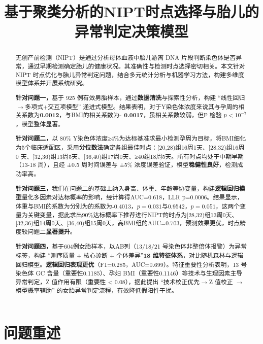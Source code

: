 \documentclass[withoutpreface,bwprint]{cumcmthesis} %
\title{基于聚类分析的NIPT时点选择与胎儿的异常判定决策模型}
\begin{document}
\maketitle
\nocite{*}


\begin{abstract}
无创产前检测（NIPT）是通过分析母体血液中胎儿游离 DNA 片段判断染色体是否异常，通过早期检测确定胎儿的健康状况。其准确性与检测时点选择密切相关。本文针对 NIPT 时点优化与胎儿异常判定问题，结合多元统计分析与机器学习方法，构建多维度模型体系并开展系统研究。

    \textbf{针对问题一，}基于 925 例有效男胎样本，通过\textbf{数据清洗}与探索性分析，构建 “线性回归$\to$多项式+交互项模型” 递进式模型。结果表明，对于Y染色体浓度来说其与孕周的相关系数为\textbf{0.0012}，与BMI的相关系数为\textbf{- 0.0017}，虽相关系数较弱，但F 检验 $p<10^{-7}$，模型整体显著。

    \textbf{针对问题二，}以 80\% Y染色体浓度≥4\%为达标基准求最小检测孕周为目标，将BMI细化为5个临床适配区，采用\textbf{分位数法}确定各组最佳时点：[20,28)组16周1天、[28,32)组16周0 天、[32,36)组13周5天、[36,40)组17周0天、≥40组18周5天。所有时点均处于中期早期（13-18 周），且经 ±0.5 周时间误差与 ±5\% 浓度误差验证，模型\textbf{稳健性良好}，检测成功率高。

    \textbf{针对问题三，}我们在问题二的基础上纳入身高、体重、年龄等协变量，构建\textbf{逻辑回归模型}量化多因素对达标概率的影响，经计算得AUC=0.618，LLR p=0.0006。结果显示，体重与BMI的系数为分别为的系数为-0.4013，$p=0.031$与0.9542，$p=0.051$，这两个变量为关键变量，据此求出90\%达标概率下推荐进行NIPT的时点为[28,32)组13周0天、[32,36)组14周0天、[36,40)组15周0天，高BMI组的AUC=0.703，预测效果更优，时点精度较问题二\textbf{显著提升}。

    \textbf{针对问题四，}基于604例女胎样本，以AB列（13/18/21 号染色体非整倍体报警）为异常标签，构建 “测序质量 + 核心诊断 + 个体差异”\textbf{18 维特征体系}，对比随机森林与逻辑回归模型。\textbf{逻辑回归表现更优}（F1=0.285，AUC=0.699）。特征重要性分析表明，13 号染色体 GC 含量（重要性0.1185）、孕妇 BMI（重要性0.1146）等技术与生理因素主导异常判定，Z 值作用有限（重要性 < 0.08），据此提出 “技术校正优先$\to$Z 值校正 $\to$ 模型概率辅助” 的女胎异常判定流程，有效降低假阳性干扰。

\end{abstract}


\section{问题重述}
\end{document}
